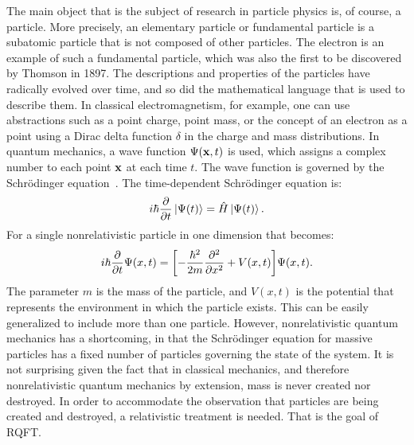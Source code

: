 The main object that is the subject of research in particle physics is, of course, a particle. More precisely, an elementary particle or fundamental particle is a subatomic particle that is not composed of other particles. The electron is an example of such a fundamental particle, which was also the first to be discovered by Thomson in 1897. The descriptions and properties of the particles have radically evolved over time, and so did the mathematical language that is used to describe them. In classical electromagnetism, for example, one can use abstractions such as a point charge, point mass, or the concept of an electron as a point using a Dirac delta function $\delta$ in the charge and mass distributions. In quantum mechanics, a wave function $\Psi(\vb{x},t)$ is used, which assigns a complex number to each point $\vb{x}$ at each time $t$. The wave function is governed by the Schrödinger equation~\cite{Liboff2002-vc,Cohen-Tannoudji1977-ms,Cohen-Tannoudji1977-rq}. The time-dependent Schrödinger equation is:
\begin{equation}
i\hbar\pdv{t}\ket{\Psi(t)}=\hat{H}\ket{\Psi(t)}.
\label{eq:schrodinger-eq}
\end{equation}
For a single nonrelativistic particle in one dimension that becomes:
\begin{equation}
i\hbar\pdv{t}\Psi(x,t)=\qty[-\frac{\hbar^2}{2m}\pdv[2]{x}+V(x,t)] \Psi(x,t).
\label{eq:schrodinger-single-eq}
\end{equation}
The parameter $m$ is the mass of the particle, and $V(x,t)$ is the potential that represents the environment in which the particle exists. This can be easily generalized to include more than one particle. However, nonrelativistic quantum mechanics has a shortcoming, in that the Schrödinger equation for massive particles has a fixed number of particles governing the state of the system. It is not surprising given the fact that in classical mechanics, and therefore nonrelativistic quantum mechanics by extension, mass is never created nor destroyed. In order to accommodate the observation that particles are being created and destroyed, a relativistic treatment is needed. That is the goal of RQFT.

